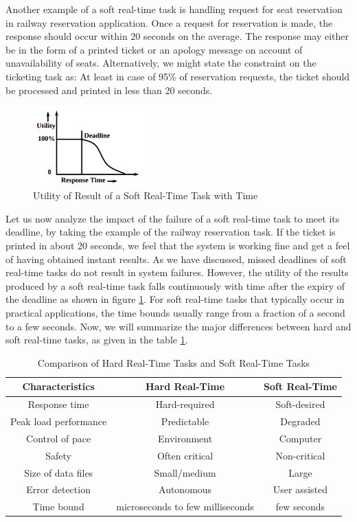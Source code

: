 \documentclass[12pt]{report}
\begin{document}
Another example of a soft real-time task is handling request for seat reservation in railway reservation application. Once a request for reservation is made, the response should occur within 20 seconds on the average. The response may either be in the form of a printed ticket or an apology message on account of unavailability of seats. Alternatively, we might state the constraint on the ticketing task as: At least in case of 95\% of reservation
requests, the ticket should be processed and printed in less than 20 seconds.
\begin{figure}[h]
\centering
\includegraphics[width=0.4\textwidth]{images/soft-rts.png}
\caption{Utility of Result of a Soft Real-Time Task with Time}
\label{fig:soft-rts}
\end{figure}

Let us now analyze the impact of the failure of a soft real-time task to meet its deadline, by taking the example of the railway reservation task. If the ticket is printed in about 20 seconds, we feel that the system is working fine and get a feel of having obtained instant results. As we have discussed, missed deadlines of soft real-time tasks do not result in system failures. However, the  utility of the results produced by a soft real-time task falls continuously with time after the expiry of the deadline as shown in figure \ref{fig:soft-rts}. For soft real-time tasks that typically occur in practical applications, the time bounds usually range from a fraction of a second to a few seconds. Now, we will summarize the major differences between hard and soft real-time tasks, as given in the table \ref{table:2}.  
\begin{table}[h]
\centering
\begin{tabular}{|c|c|c|}
 \hline
 \textbf{Characteristics} &  \textbf{Hard Real-Time} & \textbf{Soft Real-Time}\\
 \hline \hline
 Response time & Hard-required & Soft-desired\\ 
 \hline
 Peak load performance & Predictable & Degraded \\
 \hline
 Control of pace & Environment & Computer \\ 
 \hline
 Safety & Often critical & Non-critical \\
 \hline
 Size of data files & Small/medium & Large \\
 \hline
 Error detection & Autonomous & User assisted\\
 \hline
 Time bound & microseconds to few milliseconds & few seconds\\
 \hline
\end{tabular}
\caption{Comparison of Hard Real-Time Tasks and Soft Real-Time Tasks}
\label{table:2}
\end{table}
\end{document}
